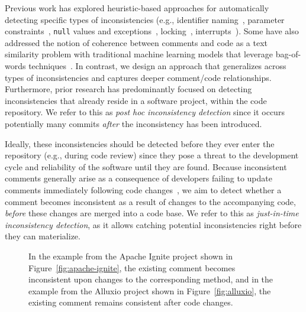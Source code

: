 \documentclass[letterpaper]{article} %
\newcommand{\Posthoc}{post hoc}
\newcommand{\JustInTime}{just-in-time}
\begin{document}
Previous work has explored heuristic-based approaches for automatically detecting specific types of inconsistencies
(e.g., identifier naming~\cite{ratol2017fragile}, parameter constraints~\cite{ZhouParameter}, \texttt{null} values and exceptions~\cite{tComment}, locking~\cite{icomment2007}, interrupts~\cite{aComment}). Some have also addressed the notion of coherence
between comments and code as a text similarity problem with traditional machine learning models that leverage bag-of-words techniques~\cite{Corazza18,Cimasa19}. In contrast, we design an approach that generalizes across types
of inconsistencies
and captures deeper comment/code relationships. Furthermore, prior research has predominantly focused on detecting inconsistencies that already reside in a software project, within the code repository. We refer to this as \textit{\Posthoc{} inconsistency detection} since it occurs potentially many commits \textit{after} the inconsistency has been introduced. %


Ideally, these inconsistencies should be detected before they ever enter the repository (e.g., during code review) since they pose a threat to the development cycle and reliability of the software until they are found. Because inconsistent comments generally arise as a consequence of developers failing to update comments immediately following code changes~\cite{WenLargeStudy}, we aim to detect whether a comment becomes inconsistent as a result of changes to the accompanying code, \textit{before} these changes are merged into a code base. We refer to this as \textit{\JustInTime{} inconsistency detection}, as it allows catching potential inconsistencies right before they can materialize.


\begin{figure}[t]
\centering
{}
\vspace{-5pt}
\caption{In the example from the Apache Ignite project shown in Figure~\ref{fig:apache-ignite}, the existing comment becomes inconsistent upon changes to the corresponding method, and in the example from the Alluxio project shown in Figure~\ref{fig:alluxio}, the existing comment remains consistent after code changes.}
\label{fig:intro_example}
\end{figure}
\end{document}
